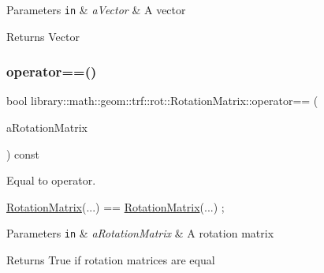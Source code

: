 \begin{DoxyParams}[1]{Parameters}
\mbox{\tt in}  & {\em a\+Vector} & A vector \\
\hline
\end{DoxyParams}
\begin{DoxyReturn}{Returns}
Vector 
\end{DoxyReturn}
\mbox{\label{classlibrary_1_1math_1_1geom_1_1trf_1_1rot_1_1_rotation_matrix_a77fcfc0ab8ee5a5a47320a2315201461}} 
\subsubsection{\texorpdfstring{operator==()}{operator==()}}
{\footnotesize\ttfamily bool library\+::math\+::geom\+::trf\+::rot\+::\+Rotation\+Matrix\+::operator== (\begin{DoxyParamCaption}\item[{const \hyperlink{classlibrary_1_1math_1_1geom_1_1trf_1_1rot_1_1_rotation_matrix}{Rotation\+Matrix} \&}]{a\+Rotation\+Matrix }\end{DoxyParamCaption}) const}



Equal to operator. 


\begin{DoxyCode}
\hyperlink{classlibrary_1_1math_1_1geom_1_1trf_1_1rot_1_1_rotation_matrix_a667d2c05aa5b0cc88775938d11164cdc}{RotationMatrix}(...) == \hyperlink{classlibrary_1_1math_1_1geom_1_1trf_1_1rot_1_1_rotation_matrix_a667d2c05aa5b0cc88775938d11164cdc}{RotationMatrix}(...) ;
\end{DoxyCode}



\begin{DoxyParams}[1]{Parameters}
\mbox{\tt in}  & {\em a\+Rotation\+Matrix} & A rotation matrix \\
\hline
\end{DoxyParams}
\begin{DoxyReturn}{Returns}
True if rotation matrices are equal 
\end{DoxyReturn}
\mbox{\label{classlibrary_1_1math_1_1geom_1_1trf_1_1rot_1_1_rotation_matrix_aba9c64b7b25d9819358c0caba6c388e2}} 
